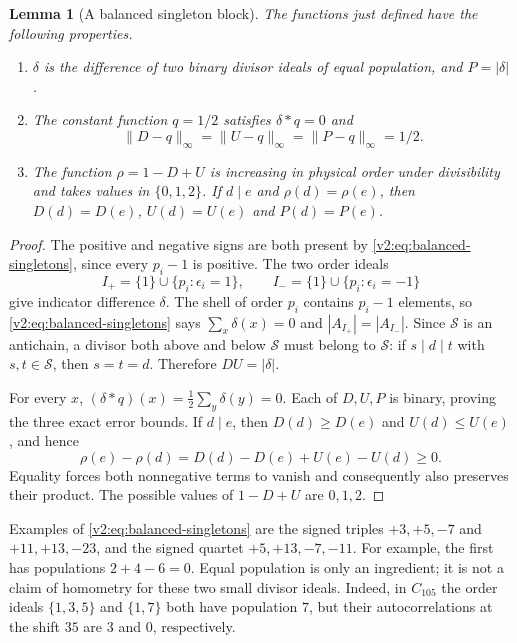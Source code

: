 \documentclass[11pt]{article}
\numberwithin{equation}{section}
\newtheorem{lemma}[theorem]{Lemma}
\theoremstyle{definition}
\theoremstyle{remark}
\begin{document}
\begin{lemma}[A balanced singleton block]\label{v2:lem:balanced-block}
The functions just defined have the following properties.
\begin{enumerate}
\item $\delta$ is the difference of two binary divisor ideals of equal
population, and $P=|\delta|$.
\item The constant function $q=1/2$ satisfies $\delta*q=0$ and
\[
 \|D-q\|_\infty=\|U-q\|_\infty=\|P-q\|_\infty=1/2.
\]
\item The function $\rho=1-D+U$ is increasing in physical order under
divisibility and takes values in $\{0,1,2\}$.  If $d\mid e$ and
$\rho(d)=\rho(e)$, then $D(d)=D(e)$, $U(d)=U(e)$ and $P(d)=P(e)$.
\end{enumerate}
\end{lemma}
\begin{proof}
The positive and negative signs are both present by
\eqref{v2:eq:balanced-singletons}, since every $p_i-1$ is positive.
The two order ideals
\[
 I_+=\{1\}\cup\{p_i:\epsilon_i=1\},\qquad
 I_-=\{1\}\cup\{p_i:\epsilon_i=-1\}
\]
give indicator difference $\delta$.  The shell of order $p_i$ contains
$p_i-1$ elements, so \eqref{v2:eq:balanced-singletons} says
$\sum_x\delta(x)=0$ and $|A_{I_+}|=|A_{I_-}|$.
Since $\mathcal S$ is an antichain, a divisor both above and below
$\mathcal S$ must belong to $\mathcal S$: if $s\mid d\mid t$ with
$s,t\in\mathcal S$, then $s=t=d$.  Therefore $DU=|\delta|$.

For every $x$, $(\delta*q)(x)=\tfrac12\sum_y\delta(y)=0$.
Each of $D,U,P$ is binary, proving the three exact error bounds.
If $d\mid e$, then $D(d)\ge D(e)$ and $U(d)\le U(e)$, and hence
\[
 \rho(e)-\rho(d)=D(d)-D(e)+U(e)-U(d)\ge0.
\]
Equality forces both nonnegative terms to vanish and consequently also
preserves their product.  The possible values of $1-D+U$ are $0,1,2$.
\end{proof}

Examples of \eqref{v2:eq:balanced-singletons} are the signed triples
$+3,+5,-7$ and $+11,+13,-23$, and the signed quartet
$+5,+13,-7,-11$.  For example, the first has populations
$2+4-6=0$.  Equal population is only an ingredient; it is not a claim
of homometry for these two small divisor ideals.  Indeed, in $C_{105}$
the order ideals $\{1,3,5\}$ and $\{1,7\}$ both have population $7$,
but their autocorrelations at the shift $35$ are $3$ and $0$, respectively.
\end{document}
